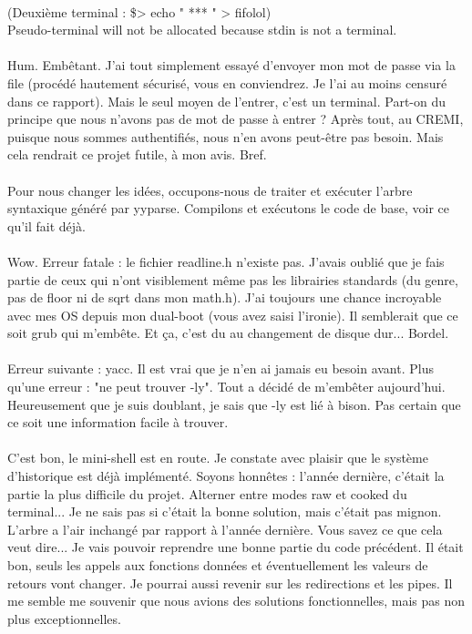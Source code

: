 \\(Deuxième terminal : \$> echo " *** " > fifolol)
\\Pseudo-terminal will not be allocated because stdin is not a terminal.
\\\\
Hum. Embêtant. J'ai tout simplement essayé d'envoyer mon mot de passe via la file (procédé hautement sécurisé, vous en conviendrez. Je l'ai au moins censuré dans ce rapport). Mais le seul moyen de l'entrer, c'est un terminal. Part-on du principe que nous n'avons pas de mot de passe à entrer ? Après tout, au CREMI, puisque nous sommes authentifiés, nous n'en avons peut-être pas besoin. Mais cela rendrait ce projet futile, à mon avis. Bref.
\\\\
Pour nous changer les idées, occupons-nous de traiter et exécuter l'arbre syntaxique généré par yyparse. Compilons et exécutons le code de base, voir ce qu'il fait déjà.
\\\\
Wow. Erreur fatale : le fichier readline.h n'existe pas. J'avais oublié que je fais partie de ceux qui n'ont visiblement même pas les librairies standards (du genre, pas de floor ni de sqrt dans mon math.h). J'ai toujours une chance incroyable avec mes OS depuis mon dual-boot (vous avez saisi l'ironie). Il semblerait que ce soit grub qui m'embête. Et ça, c'est du au changement de disque dur... Bordel.
\\\\
Erreur suivante : yacc. Il est vrai que je n'en ai jamais eu besoin avant. Plus qu'une erreur : "ne peut trouver -ly". Tout a décidé de m'embêter aujourd'hui. Heureusement que je suis doublant, je sais que -ly est lié à bison. Pas certain que ce soit une information facile à trouver.
\\\\
C'est bon, le mini-shell est en route. Je constate avec plaisir que le système d'historique est déjà implémenté. Soyons honnêtes : l'année dernière, c'était la partie la plus difficile du projet. Alterner entre modes raw et cooked du terminal... Je ne sais pas si c'était la bonne solution, mais c'était pas mignon. L'arbre a l'air inchangé par rapport à l'année dernière. Vous savez ce que cela veut dire... Je vais pouvoir reprendre une bonne partie du code précédent. Il était bon, seuls les appels aux fonctions données et éventuellement les valeurs de retours vont changer. Je pourrai aussi revenir sur les redirections et les pipes. Il me semble me souvenir que nous avions des solutions fonctionnelles, mais pas non plus exceptionnelles.
